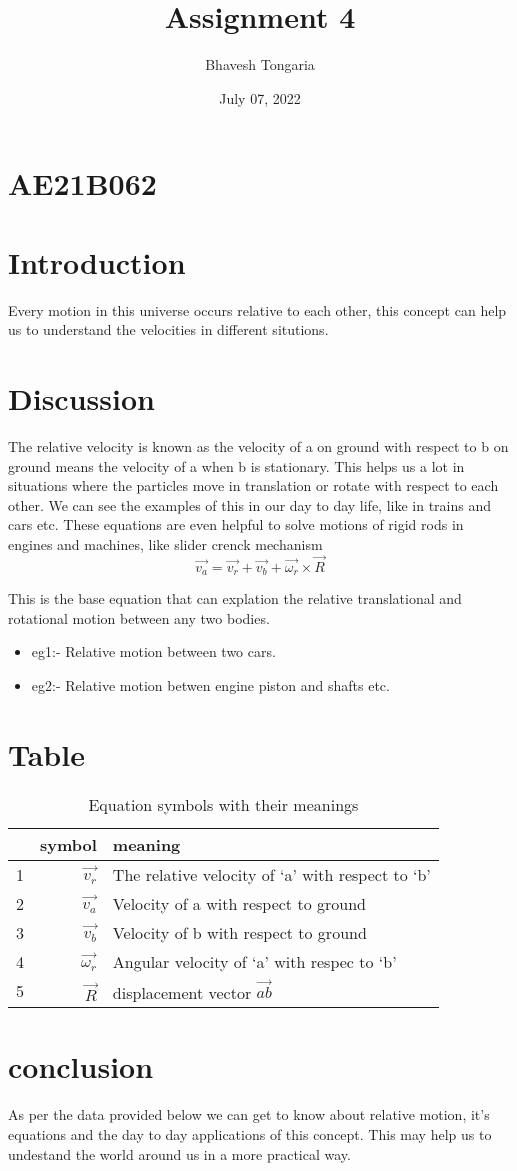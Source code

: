 \documentclass[12pt,a4paper]{article} \usepackage{amsmath} \usepackage{amsfonts} \usepackage{amssymb}
\author{Bhavesh Tongaria} \title{Assignment 4}
\date{July 07, 2022}
\begin{document}
 
\section{AE21B062}



\section{Introduction} 
Every motion in this universe occurs relative to each other, this concept can help us to understand the velocities in different situtions. 
\section{Discussion} 
The relative velocity is known as the velocity of a on ground with respect to b on ground means the velocity of a when b is
stationary. This helps us a lot in situations where the particles move in translation or rotate with respect to each other. We can see
the examples of this in our day to day life, like in trains and cars etc. These equations are even helpful to solve motions of rigid rods
in engines and machines, like slider crenck mechanism 
\begin{equation} 
\vec{v_a} = \vec{v_r} + \vec{v_b} + \vec{\omega_r}\times\vec{R}
\end{equation} 

This is the base equation that can explation the relative translational and rotational motion between any two bodies. 
\begin{itemize} 
\item eg1:- Relative motion between two cars. 
\item eg2:- Relative motion betwen engine piston and shafts etc. 
\end{itemize} 
\section{Table} 
\begin{table} 
\begin{center} 
	\begin{tabular}{|c|r|l|}
 \hline
	 & symbol & meaning \\
\hline
	1 & $\vec{v_r}$ & The relative velocity of ‘a’ with respect to ‘b’\\
        2 & $\vec{v_a}$ & Velocity of a with respect to ground \\
        3 & $\vec{v_b}$ & Velocity of b with respect to ground \\
	4 & $\vec{\omega_r}$ & Angular velocity of ‘a’ with respec to ‘b’ \\
 	5 & $\vec{R}$ & displacement vector $\vec{ab}$ \\ 
\hline
	\end{tabular} 
	\caption{Equation symbols with their meanings} 
\end{center} 
\end{table} 
\section{conclusion} As per the data provided below we can get to know about relative motion, it’s equations and the day to day
applications of this concept. This may help us to undestand the world around us in a more practical way. 

 
\end{document}
